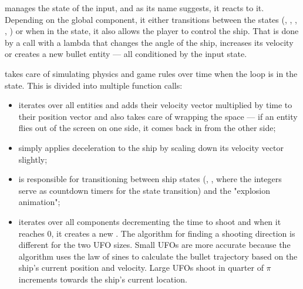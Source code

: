 \documentclass[
  digital, %
  table,   %
  twoside, %
  lof,     %
  lot,     %
]{fithesis3}
\begin{document}
 manages the state of the input, and as its name suggests,
it reacts to it. Depending on the global  component,
it either transitions between the states (, ,
, , ) or
when in the  state, it also allows the player to control the ship.
That is done by a  call with a lambda that changes the angle of the ship,
increases its velocity or creates a new bullet entity — all conditioned by the input state.

 takes care of simulating physics and game rules
over time when the loop is in the  state.
This is divided into multiple function calls:
\begin{itemize}[-]
    
    \item  {}

    iterates over all entities and adds their velocity vector multiplied
    by time  to their position vector and also takes care
    of wrapping the space — if an entity flies out of the screen on one side,
    it comes back in from the other side;

    \item {}

    simply applies deceleration to the ship by scaling down its velocity vector slightly;

    \item {}

    is responsible for transitioning between ship states
    (, , 
    where the integers serve as countdown timers for the state transition)
    and the "explosion animation";

    \item {}

    iterates over all  components decrementing the time to
    shoot and when it reaches 0, it creates a new .
    The algorithm for finding a shooting direction is different for the two UFO sizes.
    Small UFOs are more accurate because the algorithm uses
    the law of sines to calculate the bullet trajectory based on the ship's current
    position and velocity. Large UFOs shoot in quarter of $\pi$ increments
    towards the ship's current location.


\end{itemize}
\end{document}

